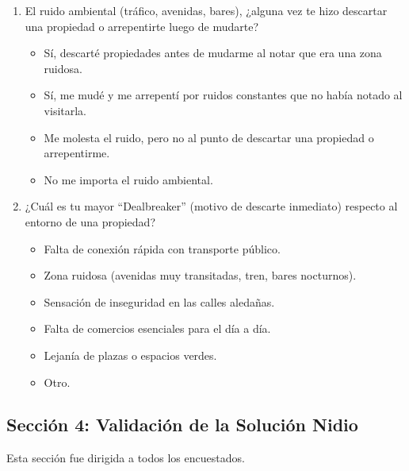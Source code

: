 \begin{enumerate}[label=\textbf{Q\arabic*:}, leftmargin=*, start=11]
\item El ruido ambiental (tráfico, avenidas, bares), ¿alguna vez te hizo descartar una propiedad o arrepentirte luego de mudarte?

\begin{itemize}
\item Sí, descarté propiedades antes de mudarme al notar que era una zona ruidosa.
\item Sí, me mudé y me arrepentí por ruidos constantes que no había notado al visitarla.
\item Me molesta el ruido, pero no al punto de descartar una propiedad o arrepentirme.
\item No me importa el ruido ambiental.
\end{itemize}

\item ¿Cuál es tu mayor ``Dealbreaker'' (motivo de descarte inmediato) respecto al entorno de una propiedad?

\begin{itemize}
\item Falta de conexión rápida con transporte público.
\item Zona ruidosa (avenidas muy transitadas, tren, bares nocturnos).
\item Sensación de inseguridad en las calles aledañas.
\item Falta de comercios esenciales para el día a día.
\item Lejanía de plazas o espacios verdes.
\item Otro.
\end{itemize}
\end{enumerate}

\subsection{Sección 4: Validación de la Solución Nidio}

Esta sección fue dirigida a todos los encuestados.

